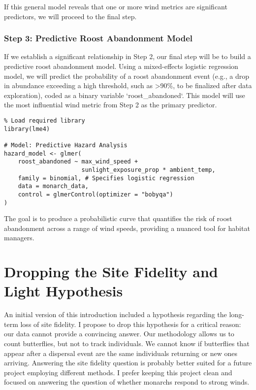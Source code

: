 If this general model reveals that one or more wind metrics are significant predictors, we will proceed to the final step.

\subsubsection{Step 3: Predictive Roost Abandonment Model}

If we establish a significant relationship in Step 2, our final step will be to build a predictive roost abandonment model. Using a mixed-effects logistic regression model, we will predict the probability of a roost abandonment event (e.g., a drop in abundance exceeding a high threshold, such as >90\%, to be finalized after data exploration), coded as a binary variable `roost_abandoned`. This model will use the most influential wind metric from Step 2 as the primary predictor.

\begin{verbatim}
% Load required library
library(lme4)

# Model: Predictive Hazard Analysis
hazard_model <- glmer(
    roost_abandoned ~ max_wind_speed + 
                      sunlight_exposure_prop * ambient_temp,
    family = binomial, # Specifies logistic regression
    data = monarch_data,
    control = glmerControl(optimizer = "bobyqa")
)
\end{verbatim}

The goal is to produce a probabilistic curve that quantifies the risk of roost abandonment across a range of wind speeds, providing a nuanced tool for habitat managers.

\section{Dropping the Site Fidelity and Light Hypothesis}

An initial version of this introduction included a hypothesis regarding the long-term loss of site fidelity. I propose to drop this hypothesis for a critical reason: our data cannot provide a convincing answer. Our methodology allows us to count butterflies, but not to track individuals. We cannot know if butterflies that appear after a dispersal event are the same individuals returning or new ones arriving. Answering the site fidelity question is probably better suited for a future project employing different methods. I prefer keeping this project clean and focused on answering the question of whether monarchs respond to strong winds.

